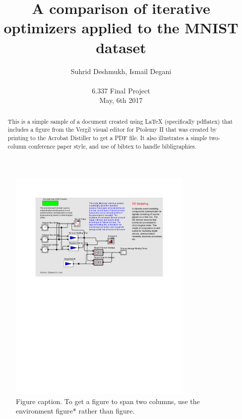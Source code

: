 \documentclass[10pt,twocolumn]{article}
\begin{document}
\title{A comparison of iterative optimizers applied to the MNIST dataset}

\author{Suhrid Deshmukh, Ismail Degani\\
\\
6.337 Final Project\\
May, 6th 2017\\
}

\maketitle
\thispagestyle{empty}

\begin{abstract}
   This is a simple sample of a document created using \LaTeX
   (specifically pdflatex)
   that includes a figure from the Vergil visual editor for Ptolemy II
   that was created by printing to the Acrobat Distiller to get a PDF file.
   It also illustrates a simple two-column conference paper style,
   and use of bibtex to handle bibligraphies.
\end{abstract}

\begin{figure}[!b]
  \begin{center}
    \includegraphics[width=3.5in]{figure.pdf}
  \end{center}

  \caption{\small Figure caption. To get a figure to span two
      columns, use the environment figure* rather than figure.}
  \label{fig-label}
\end{figure}
\end{document}
